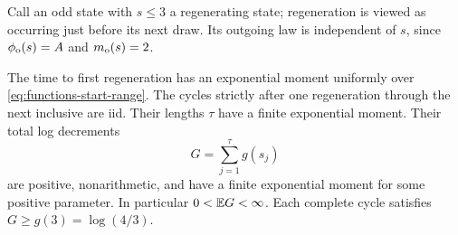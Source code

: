 Call an odd state with \(s\le3\) a regenerating state; regeneration is
viewed as occurring just before its next draw.
Its outgoing law is independent of \(s\), since
\(\phi_\mathrm o(s)=A\) and \(m_\mathrm o(s)=2\).

\begin{lemma}[Regeneration]\label{lem:regeneration}
The time to first regeneration has an exponential moment uniformly
over \eqref{eq:functions-start-range}.  The cycles strictly after one
regeneration through the next inclusive are iid.  Their lengths
\(\tau\) have a finite exponential moment.
Their total log decrements
\[
 G=\sum_{j=1}^{\tau}g(s_j)
\]
are positive, nonarithmetic, and have a finite exponential moment for
some positive parameter.  In particular \(0<\mathbb E G<\infty\).
Each complete cycle satisfies \(G\ge g(3)=\log(4/3)\).
\end{lemma}


